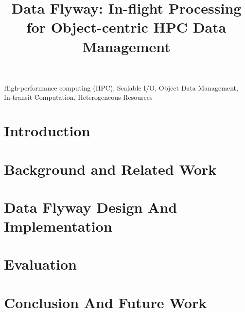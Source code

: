 \documentclass[conference]{IEEEtran}
\begin{document}
\title{Data Flyway: In-flight Processing for Object-centric HPC Data Management}

\author{
}

\maketitle

\begin{abstract}

\end{abstract}

\begin{IEEEkeywords}
High-performance computing (HPC), Scalable I/O, Object Data Management, In-transit Computation, Heterogeneous Resources
\end{IEEEkeywords}

\section{Introduction}
\label{sec:introduction}


\section{Background and Related Work}
\label{sec:background_related_motivation}


\section{Data Flyway Design And Implementation}
\label{sec:design}


\section{Evaluation}
\label{sec:evaluation}


\section{Conclusion And Future Work}
\label{sec:conclusion_futurework}




\end{document}
